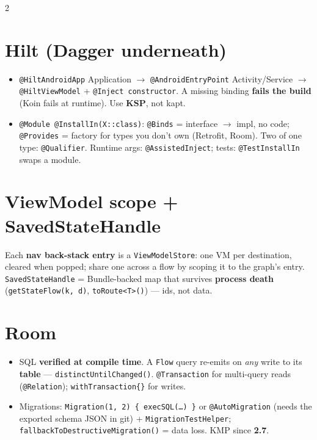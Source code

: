 \documentclass[8pt]{extarticle}
\begin{document}
\begin{multicols}{2}
\raggedright

\section{Hilt (Dagger underneath)}
\begin{itemize}\raggedright
  \item \texttt{@HiltAndroidApp} Application $\to$ \texttt{@AndroidEntryPoint} Activity/Service
        $\to$ \texttt{@HiltViewModel} + \texttt{@Inject constructor}. A missing binding
        \textbf{fails the build} (Koin fails at runtime). Use \textbf{KSP}, not kapt.
  \item \texttt{@Module @InstallIn(X::class)}: \texttt{@Binds} = interface $\to$ impl, no code;
        \texttt{@Provides} = factory for types you don't own (Retrofit, Room). Two of one
        type: \texttt{@Qualifier}. Runtime args: \texttt{@AssistedInject}; tests:
        \texttt{@TestInstallIn} swaps a module.
\end{itemize}

\section{ViewModel scope + SavedStateHandle}
\raggedright Each \textbf{nav back-stack entry} is a \texttt{ViewModelStore}: one VM per destination,
cleared when popped; share one across a flow by scoping it to the graph's entry.
\texttt{SavedStateHandle} = Bundle-backed map that survives \textbf{process death}
(\texttt{getStateFlow(k, d)}, \texttt{toRoute<T>()}) — ids, not data.

\section{Room}
\begin{itemize}\raggedright
  \item SQL \textbf{verified at compile time}. A \texttt{Flow} query re-emits on \emph{any}
        write to its \textbf{table} — \texttt{distinctUntilChanged()}. \texttt{@Transaction}
        for multi-query reads (\texttt{@Relation}); \texttt{withTransaction\{\}} for writes.
  \item Migrations: \texttt{Migration(1, 2) \{ execSQL(…) \}} or \texttt{@AutoMigration}
        (needs the exported schema JSON in git) + \texttt{MigrationTestHelper};
        \texttt{fallbackToDestructiveMigration()} = data loss. KMP since \textbf{2.7}.
\end{itemize}


\end{multicols}
\end{document}
